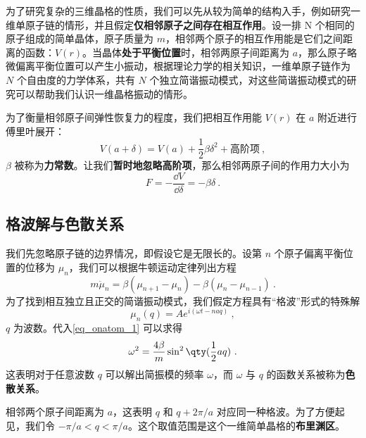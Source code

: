 

为了研究复杂的三维晶格的性质，我们可以先从较为简单的结构入手，例如研究一维单原子链的情形，并且假定\textbf{仅相邻原子之间存在相互作用}。设一排 N 个相同的原子组成的简单晶体，原子质量为 $m$，相邻两个原子的相互作用能是它们之间距离的函数：$V(r)$。当晶体\textbf{处于平衡位置}时，相邻两原子间距离为 $a$，那么原子略微偏离平衡位置可以产生小振动，根据理论力学的相关知识，一维单原子链作为 $N$ 个自由度的力学体系，共有 $N$ 个独立简谐振动模式，对这些简谐振动模式的研究可以帮助我们认识一维晶格振动的情形。

为了衡量相邻原子间弹性恢复力的程度，我们把相互作用能 $V(r)$ 在 $a$ 附近进行傅里叶展开：
\begin{equation}
V(a+\delta)=V(a)+\frac{1}{2}\beta \delta^2+\text{高阶项}~,
\end{equation}
$\beta$ 被称为\textbf{力常数}。让我们\textbf{暂时地忽略高阶项}，那么相邻两原子间的作用力大小为
\begin{equation}
F=-\frac{\dd V}{\dd \delta}=-\beta\delta~.
\end{equation}

\subsection{格波解与色散关系}
我们先忽略原子链的边界情况，即假设它是无限长的。设第 $n$ 个原子偏离平衡位置的位移为 $\mu_n$，我们可以根据牛顿运动定律列出方程
\begin{equation}\label{eq_onatom_1}
m \ddot \mu_n = \beta(\mu_{n+1}-\mu_n)-\beta(\mu_n - \mu_{n-1})~.
\end{equation}
为了找到相互独立且正交的简谐振动模式，我们假定方程具有“格波”形式的特殊解
\begin{equation}\label{eq_onatom_2}
\mu_{n}(q)=Ae^{i(\omega t-naq)}~,
\end{equation}
$q$ 为波数。代入\autoref{eq_onatom_1} 可以求得
\begin{equation}\label{eq_onatom_3}
\omega^2=\frac{4\beta}{m}\sin^2 \qty(\frac{1}{2}aq)~.
\end{equation}
这表明对于任意波数 $q$ 可以解出简振模的频率 $\omega$，而 $\omega$ 与 $q$ 的函数关系被称为\textbf{色散关系}。

相邻两个原子间距离为 $a$，这表明 $q$ 和 $q+2\pi/a$ 对应同一种格波。为了方便起见，我们令 $-\pi/a<q<\pi/a$。这个取值范围是这个一维简单晶格的\textbf{布里渊区}。

